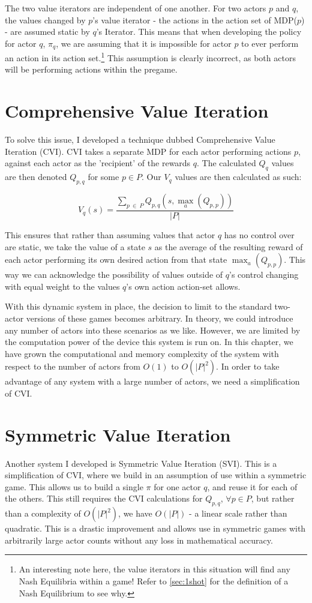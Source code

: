The two value iterators are independent of one another. For two actors $p$ and $q$, the values changed by $p$'s value iterator - the actions in the action set of MDP($p$) - are assumed static by $q$'s Iterator. This means that when developing the policy for actor $q$, $\pi_q$, we are assuming that it is impossible for actor $p$ to ever perform an action in its action set.\footnote{An interesting note here, the value iterators in this situation will find any Nash Equilibria within a game! Refer to \ref{sec:1shot} for the definition of a Nash Equilibrium to see why.} This assumption is clearly incorrect, as both actors will be performing actions within the pregame.

\section{Comprehensive Value Iteration}

To solve this issue, I developed a technique dubbed Comprehensive Value Iteration (CVI). CVI takes a separate MDP for each actor performing actions $p$, against each actor as the 'recipient' of the rewards $q$. The calculated $Q_q$ values are then denoted $Q_{p,q}$ for some $p \in P$. Our $V_q$ values are then calculated as such:

\[V_{q}\left(s\right)=\frac{\sum_{p\ \in\ P}^{ }Q_{p,q}\left(s,\max_{a}\left(Q_{p,p}\right)\right)}{\left|P\right|}\]

This ensures that rather than assuming values that actor $q$ has no control over are static, we take the value of a state $s$ as the average of the resulting reward of each actor performing its own desired action from that state $\max_{a}\left(Q_{p,p}\right)$. This way we can acknowledge the possibility of values outside of $q$'s control changing with equal weight to the values $q$'s own action action-set allows.

With this dynamic system in place, the decision to limit to the standard two-actor versions of these games becomes arbitrary. In theory, we could introduce any number of actors into these scenarios as we like. However, we are limited by the computation power of the device this system is run on. In this chapter, we have grown the computational and memory complexity of the system with respect to the number of actors from $O(1)$ to $O(\left|P\right|^{2})$. In order to take advantage of any system with a large number of actors, we need a simplification of CVI.

\section{Symmetric Value Iteration}

Another system I developed is Symmetric Value Iteration (SVI). This is a simplification of CVI, where we build in an assumption of use within a symmetric game. This allows us to build a single $\pi$ for one actor $q$, and reuse it for each of the others. This still requires the CVI calculations for $Q_{p,q}$, $\forall p \in P$, but rather than a complexity of $O(\left|P\right|^{2})$, we have $O(\left|P\right|)$ - a linear scale rather than quadratic. This is a drastic improvement and allows use in symmetric games with arbitrarily large actor counts without any loss in mathematical accuracy.
